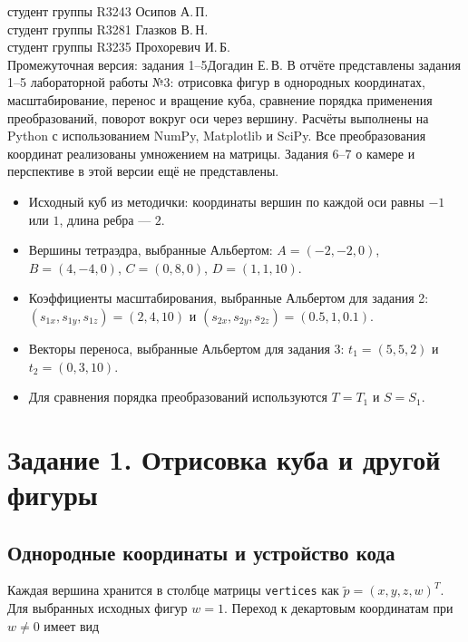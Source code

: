 \documentclass[a4paper,14pt]{extarticle}
\begin{document}
{студент группы R3243 Осипов А.\,П.\\[4pt]
студент группы R3281 Глазков В.\,Н.\\[4pt]
студент группы R3235 Прохоревич И.\,Б.\\[8pt]
Промежуточная версия: задания 1--5}{Догадин Е.\,В.}
\tableofcontents
\clearpage
{}
В отчёте представлены задания 1--5 лабораторной работы №3: отрисовка фигур
в однородных координатах, масштабирование, перенос и вращение куба,
сравнение порядка применения преобразований, поворот вокруг оси через вершину.
Расчёты выполнены на Python с использованием NumPy, Matplotlib и SciPy.
Все преобразования координат реализованы умножением на матрицы.
Задания 6--7 о камере и перспективе в этой версии ещё не представлены.
\begin{itemize}
\item Исходный куб из методички: координаты вершин по каждой оси равны $-1$ или $1$,
  длина ребра — $2$.
\item Вершины тетраэдра, выбранные Альбертом:
  $A=(-2,-2,0)$, $B=(4,-4,0)$, $C=(0,8,0)$, $D=(1,1,10)$.
\item Коэффициенты масштабирования, выбранные Альбертом для задания 2:
  $(s_{1x},s_{1y},s_{1z})=(2,4,10)$ и
  $(s_{2x},s_{2y},s_{2z})=(0.5,1,0.1)$.
\item Векторы переноса, выбранные Альбертом для задания 3:
  $t_1=(5,5,2)$ и $t_2=(0,3,10)$.
\item Для сравнения порядка преобразований используются $T=T_1$ и $S=S_1$.
\end{itemize}
\clearpage
\section{Задание 1. Отрисовка куба и другой фигуры}

\subsection*{Однородные координаты и устройство кода}

Каждая вершина хранится в столбце матрицы \texttt{vertices} как
$\widetilde p=(x,y,z,w)^T$. Для выбранных исходных фигур $w=1$.
Переход к декартовым координатам при $w\ne0$ имеет вид

\begin{center}\end{center}
\end{document}
